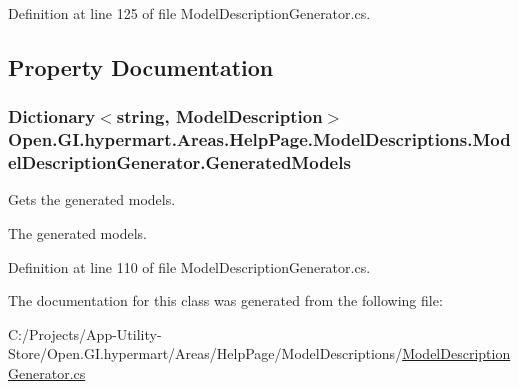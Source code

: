 Definition at line 125 of file Model\+Description\+Generator.\+cs.



\subsection{Property Documentation}
\hypertarget{class_open_1_1_g_i_1_1hypermart_1_1_areas_1_1_help_page_1_1_model_descriptions_1_1_model_description_generator_ad4d703c3da52e11a1e52c12ae04e88a6}{}
\subsubsection[{Generated\+Models}]{\setlength{\rightskip}{0pt plus 5cm}Dictionary$<$string, {\bf Model\+Description}$>$ Open.\+G\+I.\+hypermart.\+Areas.\+Help\+Page.\+Model\+Descriptions.\+Model\+Description\+Generator.\+Generated\+Models\hspace{0.3cm}{\ttfamily [get]}}\label{class_open_1_1_g_i_1_1hypermart_1_1_areas_1_1_help_page_1_1_model_descriptions_1_1_model_description_generator_ad4d703c3da52e11a1e52c12ae04e88a6}


Gets the generated models. 

The generated models. 

Definition at line 110 of file Model\+Description\+Generator.\+cs.



The documentation for this class was generated from the following file\+:\begin{DoxyCompactItemize}
\item 
C\+:/\+Projects/\+App-\/\+Utility-\/\+Store/\+Open.\+G\+I.\+hypermart/\+Areas/\+Help\+Page/\+Model\+Descriptions/\hyperlink{_model_description_generator_8cs}{Model\+Description\+Generator.\+cs}\end{DoxyCompactItemize}
